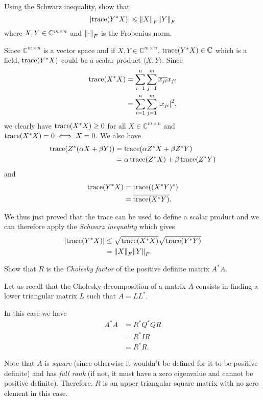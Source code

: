 Using the Schwarz inequality, show that
\[
{\left\lvert\operatorname{trace}(Y^*X)\right\lvert} \leqslant {\left\lVert X\right\rVert}_F {\left\lVert Y\right\rVert}_F
\]
where \(X, Y \in \mathbb{C}^{m \times n}\) and \({\left\lVert\cdot\right\rVert}_F\) is the Frobenius norm.
\begin{solution}
  Since $\mathbb{C}^{m \times n}$ is a vector space and if $X,Y \in \mathbb{C}^{m \times n}$, $\operatorname{trace}(Y^*X) \in \mathbb{C}$ which is a field,
  $\operatorname{trace}(Y^*X)$ could be a scalar product $\langle X,Y \rangle$.
  Since
  \begin{align*}
    \operatorname{trace}(X^*X)
    & = \sum_{i = 1}^n \sum_{j = 1}^m \overline{x_{ji}}x_{ji}\\
    & = \sum_{i = 1}^n \sum_{j = 1}^m {\left\lvert x_{ji}\right\lvert}^2,
  \end{align*}
  we clearly have $\operatorname{trace}(X^*X) \geq 0$ for all $X \in \mathbb{C}^{m \times n}$ and
  $\operatorname{trace}(X^*X) = 0 \iff X = 0$.
  We also have
  \begin{align*}
    \operatorname{trace}(Z^*(\alpha X + \beta Y))
    & = \operatorname{trace}(\alpha Z^*X + \beta Z^*Y)\\
    & = \alpha\operatorname{trace}(Z^*X) + \beta\operatorname{trace}(Z^*Y)
  \end{align*}
  and
  \begin{align*}
    \operatorname{trace}(Y^*X)
    & = \operatorname{trace}((X^*Y)^*)\\
    & = \overline{\operatorname{trace}(X^*Y)}.
  \end{align*}
  
  We thus just proved that the trace can be used to define a scalar product and we can therefore apply the \emph{Schwarz inequality} which gives
  \begin{align*}
    {\left\lvert\operatorname{trace}(Y^*X)\right\lvert}
    & \leq \sqrt{\operatorname{trace}(X^*X)} \sqrt{\operatorname{trace}(Y^*Y)}\\
    & = {\left\lVert X\right\rVert}_F {\left\lVert Y\right\rVert}_F.
  \end{align*}
\end{solution}

Show that $R$ is the \emph{Cholesky factor} of the positive definite matrix $A^*A$.
\begin{solution}
  Let us recall that the Cholesky decomposition of a matrix $A$ consists in finding
  a lower triangular matrix $L$ such that $A = L L^*$.
  
  In this case we have
  \begin{align*}
    A^*A
    & = R^*Q^*QR\\
    & = R^*IR\\
    & = R^*R.
  \end{align*}

  Note that $A$ is \emph{square}
  (since otherwise it wouldn't be defined for it to be positive definite)
  and has \emph{full rank} (if not, it must have a zero eigenvalue and cannot be positive definite).
  Therefore, $R$ is an upper triangular square matrix with no zero element in this case.
\end{solution}


